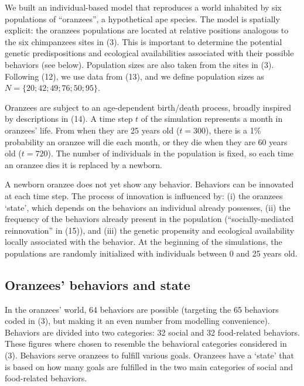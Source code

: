 \documentclass[9pt,twocolumn,twoside,]{pnas-new}
\begin{document}
We built an individual-based model that reproduces a world inhabited by
six populations of ``oranzees'', a hypothetical ape species. The model
is spatially explicit: the oranzees populations are located at relative
positions analogous to the six chimpanzees sites in (3). This is
important to determine the potential genetic predispositions and
ecological availabilities associated with their possible behaviors (see
below). Population sizes are also taken from the sites in (3). Following
(12), we use data from (13), and we define population sizes as
\(N=\{20;42;49;76;50;95\}\).

Oranzees are subject to an age-dependent birth/death process, broadly
inspired by descriptions in (14). A time step \(t\) of the simulation
represents a month in oranzees' life. From when they are 25 years old
(\(t=300\)), there is a 1\% probability an oranzee will die each month,
or they die when they are 60 years old (\(t=720\)). The number of
individuals in the population is fixed, so each time an oranzee dies it
is replaced by a newborn.

A newborn oranzee does not yet show any behavior. Behaviors can be
innovated at each time step. The process of innovation is influenced by:
(i) the oranzees `state', which depends on the behaviors an individual
already possesses, (ii) the frequency of the behaviors already present
in the population (``socially-mediated reinnovation'' in (15)), and
(iii) the genetic propensity and ecological availability locally
associated with the behavior. At the beginning of the simulations, the
populations are randomly initialized with individuals between 0 and 25
years old.

\subsection*{Oranzees' behaviors and state}\label{format}

In the oranzees' world, 64 behaviors are possible (targeting the 65
behaviors coded in (3), but making it an even number from modelling
convenience). Behaviors are divided into two categories: 32 social and
32 food-related behaviors. These figures where chosen to resemble the
behavioral categories considered in (3). Behaviors serve oranzees to
fulfill various goals. Oranzees have a `state' that is based on how many
goals are fulfilled in the two main categories of social and
food-related behaviors.
\end{document}
